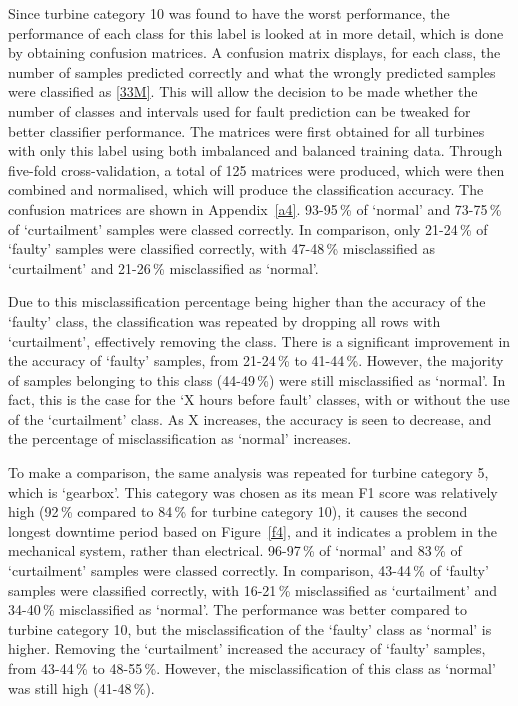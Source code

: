 Since turbine category 10 was found to have the worst performance, the performance of each class for this label is looked at in more detail, which is done by obtaining confusion matrices. A confusion matrix displays, for each class, the number of samples predicted correctly and what the wrongly predicted samples were classified as \ref{33M}. This will allow the decision to be made whether the number of classes and intervals used for fault prediction can be tweaked for better classifier performance. The matrices were first obtained for all turbines with only this label using both imbalanced and balanced training data. Through five-fold cross-validation, a total of 125 matrices were produced, which were then combined and normalised, which will produce the classification accuracy. The confusion matrices are shown in Appendix~\ref{a4}. 93-95\,\% of `normal' and 73-75\,\% of `curtailment' samples were classed correctly. In comparison, only 21-24\,\% of `faulty' samples were classified correctly, with 47-48\,\% misclassified as `curtailment' and 21-26\,\% misclassified as `normal'.

Due to this misclassification percentage being higher than the accuracy of the `faulty' class, the classification was repeated by dropping all rows with `curtailment', effectively removing the class. There is a significant improvement in the accuracy of `faulty' samples, from 21-24\,\% to 41-44\,\%. However, the majority of samples belonging to this class (44-49\,\%) were still misclassified as `normal'. In fact, this is the case for the `X hours before fault' classes, with or without the use of the `curtailment' class. As X increases, the accuracy is seen to decrease, and the percentage of misclassification as `normal' increases.

To make a comparison, the same analysis was repeated for turbine category 5, which is `gearbox'. This category was chosen as its mean F1 score was relatively high (92\,\% compared to 84\,\% for turbine category 10), it causes the second longest downtime period based on Figure~\ref{f4}, and it indicates a problem in the mechanical system, rather than electrical. 96-97\,\% of `normal' and 83\,\% of `curtailment' samples were classed correctly. In comparison, 43-44\,\% of `faulty' samples were classified correctly, with 16-21\,\% misclassified as `curtailment' and 34-40\,\% misclassified as `normal'. The performance was better compared to turbine category 10, but the misclassification of the `faulty' class as `normal' is higher. Removing the `curtailment' increased the accuracy of `faulty' samples, from 43-44\,\% to 48-55\,\%. However, the misclassification of this class as `normal' was still high (41-48\,\%).

